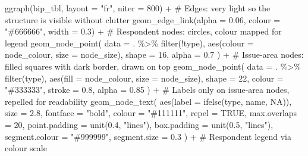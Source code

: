 \documentclass[
  letterpaper,
  DIV=11,
  numbers=noendperiod]{scrartcl}
\newenvironment{Shaded}{\begin{snugshade}}{\end{snugshade}}
\newcommand{\AttributeTok}[1]{\textcolor[rgb]{0.40,0.45,0.13}{#1}}
\newcommand{\CommentTok}[1]{\textcolor[rgb]{0.37,0.37,0.37}{#1}}
\newcommand{\ConstantTok}[1]{\textcolor[rgb]{0.56,0.35,0.01}{#1}}
\newcommand{\DecValTok}[1]{\textcolor[rgb]{0.68,0.00,0.00}{#1}}
\newcommand{\FloatTok}[1]{\textcolor[rgb]{0.68,0.00,0.00}{#1}}
\newcommand{\FunctionTok}[1]{\textcolor[rgb]{0.28,0.35,0.67}{#1}}
\newcommand{\NormalTok}[1]{\textcolor[rgb]{0.00,0.23,0.31}{#1}}
\newcommand{\SpecialCharTok}[1]{\textcolor[rgb]{0.37,0.37,0.37}{#1}}
\newcommand{\StringTok}[1]{\textcolor[rgb]{0.13,0.47,0.30}{#1}}
\begin{document}
\begin{Shaded}
\begin{Highlighting}[]
\FunctionTok{ggraph}\NormalTok{(bip\_tbl, }\AttributeTok{layout =} \StringTok{"fr"}\NormalTok{, }\AttributeTok{niter =} \DecValTok{800}\NormalTok{) }\SpecialCharTok{+}
  \CommentTok{\# Edges: very light so the structure is visible without clutter}
  \FunctionTok{geom\_edge\_link}\NormalTok{(}\AttributeTok{alpha =} \FloatTok{0.06}\NormalTok{, }\AttributeTok{colour =} \StringTok{"\#666666"}\NormalTok{, }\AttributeTok{width =} \FloatTok{0.3}\NormalTok{) }\SpecialCharTok{+}
  \CommentTok{\# Respondent nodes: circles, colour mapped for legend}
  \FunctionTok{geom\_node\_point}\NormalTok{(}
    \AttributeTok{data =}\NormalTok{ . }\SpecialCharTok{\%\textgreater{}\%} \FunctionTok{filter}\NormalTok{(}\SpecialCharTok{!}\NormalTok{type),}
    \FunctionTok{aes}\NormalTok{(}\AttributeTok{colour =}\NormalTok{ node\_colour, }\AttributeTok{size =}\NormalTok{ node\_size),}
    \AttributeTok{shape =} \DecValTok{16}\NormalTok{, }\AttributeTok{alpha =} \FloatTok{0.7}
\NormalTok{  ) }\SpecialCharTok{+}
  \CommentTok{\# Issue{-}area nodes: filled squares with dark border, drawn on top}
  \FunctionTok{geom\_node\_point}\NormalTok{(}
    \AttributeTok{data =}\NormalTok{ . }\SpecialCharTok{\%\textgreater{}\%} \FunctionTok{filter}\NormalTok{(type),}
    \FunctionTok{aes}\NormalTok{(}\AttributeTok{fill =}\NormalTok{ node\_colour, }\AttributeTok{size =}\NormalTok{ node\_size),}
    \AttributeTok{shape =} \DecValTok{22}\NormalTok{, }\AttributeTok{colour =} \StringTok{"\#333333"}\NormalTok{, }\AttributeTok{stroke =} \FloatTok{0.8}\NormalTok{, }\AttributeTok{alpha =} \FloatTok{0.85}
\NormalTok{  ) }\SpecialCharTok{+}
  \CommentTok{\# Labels only on issue{-}area nodes, repelled for readability}
  \FunctionTok{geom\_node\_text}\NormalTok{(}
    \FunctionTok{aes}\NormalTok{(}\AttributeTok{label =} \FunctionTok{ifelse}\NormalTok{(type, name, }\ConstantTok{NA}\NormalTok{)),}
    \AttributeTok{size =} \FloatTok{2.8}\NormalTok{, }\AttributeTok{fontface =} \StringTok{"bold"}\NormalTok{, }\AttributeTok{colour =} \StringTok{"\#111111"}\NormalTok{,}
    \AttributeTok{repel =} \ConstantTok{TRUE}\NormalTok{, }\AttributeTok{max.overlaps =} \DecValTok{20}\NormalTok{,}
    \AttributeTok{point.padding =} \FunctionTok{unit}\NormalTok{(}\FloatTok{0.4}\NormalTok{, }\StringTok{"lines"}\NormalTok{),}
    \AttributeTok{box.padding =} \FunctionTok{unit}\NormalTok{(}\FloatTok{0.5}\NormalTok{, }\StringTok{"lines"}\NormalTok{),}
    \AttributeTok{segment.colour =} \StringTok{"\#999999"}\NormalTok{, }\AttributeTok{segment.size =} \FloatTok{0.3}
\NormalTok{  ) }\SpecialCharTok{+}
  \CommentTok{\# Respondent legend via colour scale}

\end{Highlighting}
\end{Shaded}
\end{document}
